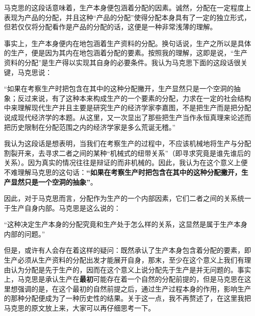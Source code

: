 \documentclass[a4paper,twoside,12pt,AutoFakeBold]{ctexart}
\begin{document}
马克思的这段话意味着，生产本身便包涵着分配的因素。诚然，分配在一定程度上表现为产品的分配，并且这种“产品的分配”使得分配本身具有了一定的独立形式，但若仅仅将分配看作是产品的分配的话，这便是一种非常浅薄的理解。

事实上，生产本身便内在地包涵着生产资料的分配。换句话说，生产之所以是具体的生产，便是因为其内在地包涵着分配的要素。按照我的理解，这即是说，“生产资料的分配”是生产得以实现其自身的必要条件。我认为马克思下面的这段话很关键，马克思说：
\begin{adjustwidth}{2em}{2em}
    \qquad\fangsong
    “如果在考察生产时把包含在其中的这种分配撇开，生产显然只是一个空洞的抽象；反过来说，有了这种本来构成生产的一个要素的分配，力求在一定的社会结构中来理解现代生产并且主要是研究生产的经济学家李嘉图，不是把生产而是把分配说成现代经济学的本题。从这里，又一次显出了那些把生产当作永恒真理来论述而把历史限制在分配范围之内的经济学家是多么荒诞无稽。”
\end{adjustwidth}

我认为这段话是想表明，当我们在考察生产的过程中，不应该机械地将生产与分配割裂开来，去寻求二者之间的某种“机械式的纽带关系”（即寻求究竟是谁先谁后的关系）。因为真实的情况往往是辩证的而非机械的。因此，我认为在这个意义上便不难理解马克思的这句话：\textbf{“如果在考察生产时把包含在其中的这种分配撇开，生产显然只是一个空洞的抽象”}。

因此，对于马克思而言，分配作为生产的一个内部因素，它们二者之间的关系统一于生产自身内部。马克思是这么说的：
\begin{adjustwidth}{2em}{2em}
    \qquad\fangsong
    “这种决定生产本身的分配究竟和生产处于怎么样的关系，这显然是属于生产本身内部的问题。”
\end{adjustwidth}

但是，或许有人会存在着这样的疑问：既然承认了生产本身包含着分配的要素，即生产必须从生产资料的分配出发才能展开自身，那末，至少在这个意义上我们有理由认为分配是先于生产的，因而在这个意义上说分配先于生产是并无问题的。事实上，马克思是承认生产在\textbf{最初}可能存在着一个自然的分配前提的，但是马克思在这里想强调的是，在这个最初的自然前提之后，通过生产过程本身的作用，影响生产的那种分配便成为了一种历史性的结果。关于这一点，我不再赘述了，在这里我把马克思的原文放上来，大家可以再仔细思考一下。
\end{document}
